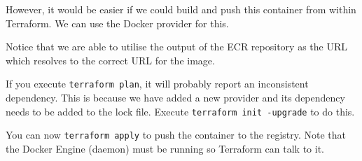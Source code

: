 \documentclass{csse4400}
\begin{document}
However, it would be easier if we could build and push this container from within Terraform.
We can use the Docker provider for this.


Notice that we are able to utilise the output of the ECR repository as the URL which resolves to the correct URL for the image.

If you execute \texttt{terraform plan}, it will probably report an inconsistent dependency.
This is because we have added a new provider and its dependency needs to be added to the lock file.
Execute \texttt{terraform init -upgrade} to do this.

You can now \texttt{terraform apply} to push the container to the registry.
Note that the Docker Engine (daemon) must be running so Terraform can talk to it.






\end{document}
